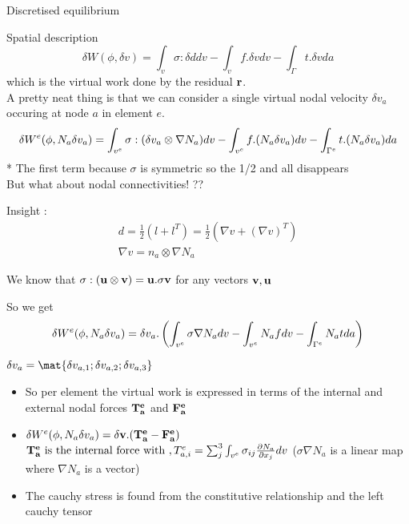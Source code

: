 	\begin{frame}{Discretised equilibrium}
		\begin{block}{Spatial description}
			\begin{equation}
				\delta W(\phi,\delta v) = \int_v \sigma : \delta d dv - \int_v f. \delta v dv - \int_{\Gamma} t. \delta v da
			\end{equation}
			which is the virtual work done by the residual $\mathbf{r}$. \\
			A pretty neat thing is that we can consider a single virtual nodal velocity $\delta v_a$ occuring at node $a$ in element $e$. 
			\begin{equation}
			\delta W^e(\phi,N_a\delta v_a) =  \int_{v^e} \mathbf{\sigma} : (\delta v_a \otimes \nabla N_a) dv - \int_{v^e} f. (N_a \delta v_a) dv - \int_{\Gamma^e} t. (N_a \delta v_a)da
			\end{equation}
			* The first term because $\sigma$ is symmetric so the 1/2 and all disappears\\
			But what about nodal connectivities! ??
		\end{block}
	
		Insight :
		\begin{equation}
			\begin{aligned}
			d = \frac{1}{2}\left(l  + l^T \right) = \frac{1}{2}\left(\nabla v + (\nabla v)^T \right) \\
			\nabla v = n_a \otimes \nabla N_a 
			\end{aligned}
		\end{equation}
	\end{frame}


	\begin{frame}
		We know that $\mathbf{\sigma :(u \otimes v) = u. \sigma v}$ for any vectors $\mathbf{v,u}$
		
		So we get 
		\begin{equation}
			\delta W^e(\phi,N_a\delta v_a) =  \delta v_a .\left(\int_{v^e} \mathbf{\sigma} \nabla N_a dv - \int_{v^e} N_af dv - \int_{\Gamma^e} N_a tda \right)
		\end{equation}
		
		$\delta v_a = \mat{\delta v_{a,1} ; \delta v_{a,2}; \delta v_{a,3}}$\\
		
		\begin{itemize}
			\item So per element the virtual work is expressed in terms of the internal and external nodal forces $\mathbf{T_a^e}$ and $\mathbf{F_a^e}$
			\item $ \delta W^e(\phi,N_a\delta v_a) = \mathbf{\delta v.(T_a^e-F_a^e)}$ \\
			$\mathbf{T_a^e} ~\text{is the internal force with }, T_{a,i}^e = \sum_{j}^{3} \int_{v^e} \sigma_{ij}\frac{\partial N_a}{\partial x_j} dv$ ($\sigma \nabla N_a$ is a linear map where $\nabla N_a$ is a vector)	
			\item The cauchy stress is found from the constitutive relationship and the left cauchy tensor	
		\end{itemize}
	\end{frame}


